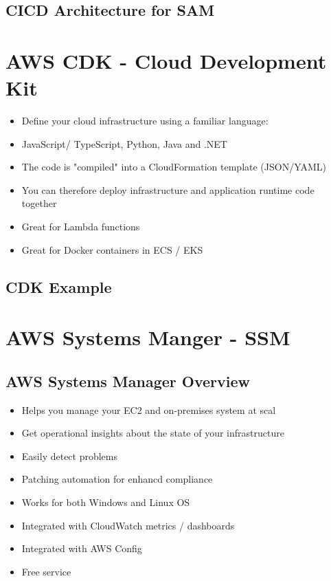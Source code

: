 \subsection{CICD Architecture for SAM}


\section{AWS CDK - Cloud Development Kit}
\begin{itemize}
    \item Define your cloud infrastructure using a familiar language:
    \item JavaScript/ TypeScript, Python, Java and .NET
    \item The code is "compiled" into a CloudFormation template (JSON/YAML)
    \item You can therefore deploy infrastructure and application runtime code together
    \item Great for Lambda functions
    \item Great for Docker containers in ECS / EKS
\end{itemize}

\subsection{CDK Example}


\section{AWS Systems Manger - SSM}

\subsection{AWS Systems Manager Overview}
\begin{itemize}
    \item Helps you manage your EC2 and on-premises system at scal
    \item Get operational insights about the state of your infrastructure
    \item Easily detect problems
    \item Patching automation for enhancd compliance
    \item Works for both Windows and Linux OS
    \item Integrated with CloudWatch metrics / dashboards
    \item Integrated with AWS Config
    \item Free service
\end{itemize}

